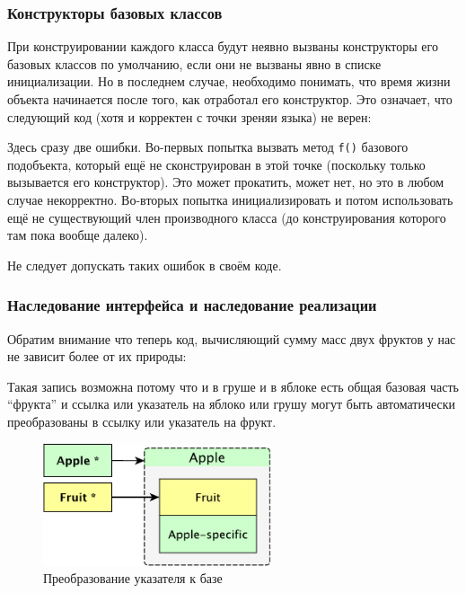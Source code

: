 \documentclass[a4paper,12pt,oneside]{article}
\begin{document}
\subsubsection{Конструкторы базовых классов}

При конструировании каждого класса будут неявно вызваны конструкторы его базовых классов по умолчанию, если они не вызваны явно в списке инициализации. Но в последнем случае, необходимо понимать, что время жизни объекта начинается после того, как отработал его конструктор. Это означает, что следующий код (хотя и корректен с точки зреняи языка) не верен:



Здесь сразу две ошибки. Во-первых попытка вызвать метод \lstinline!f()! базового подобъекта, который ещё не сконструирован в этой точке (поскольку только вызывается его конструктор). Это может прокатить, может нет, но это в любом случае некорректно. Во-вторых попытка инициализировать и потом использовать ещё не существующий член производного класса (до конструирования которого там пока вообще далеко).

Не следует допускать таких ошибок в своём коде.

\subsubsection{Наследование интерфейса и наследование реализации}

Обратим внимание что теперь код, вычисляющий сумму масс двух фруктов у нас не зависит более от их природы:



Такая запись возможна потому что и в груше и в яблоке есть общая базовая часть ``фрукта'' и ссылка или указатель на яблоко или грушу могут быть автоматически преобразованы в ссылку или указатель на фрукт.

\begin{figure}[h!]
\centering
\includegraphics[width=0.6\textwidth]{illustrations/fruitptr-crop.pdf}
\caption{Преобразование указателя к базе}
\label{fig:fruitptr-crop}
\end{figure}
\end{document}

